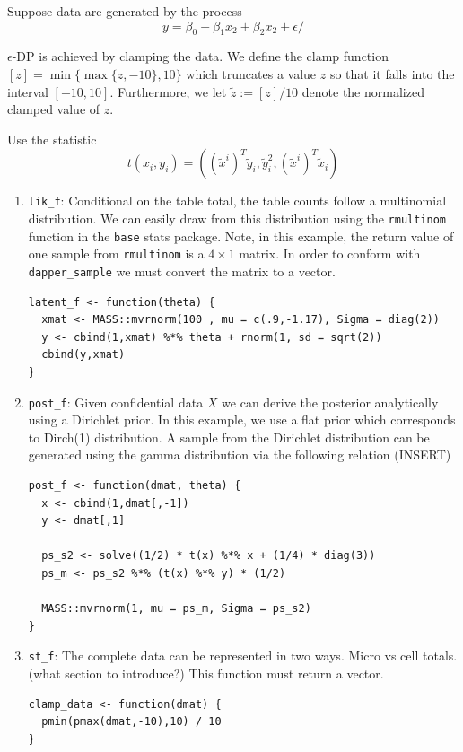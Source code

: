 Suppose data are generated by the process
\[
y = \beta_0 + \beta_1x_2 + \beta_2x_2 + \epsilon/
\]

\(\epsilon\)-DP is achieved by clamping the data. We define
the clamp function \([z] = \min\{\max\{z,-10\}, 10\}\) which truncates a value
\(z\) so that it falls into the interval \([-10,10]\). Furthermore, we let \(\tilde{z} := [z]/10\)
denote the normalized clamped value of \(z\).

Use the statistic
\[
t(x_i,y_i) = ((\tilde{x}^{i})^T \tilde{y}_i, \tilde{y}_i^2, (\tilde{x}^{i})^T \tilde{x}_i)
\]

\begin{enumerate}
\def\labelenumi{\arabic{enumi}.}
\item
  \texttt{lik\_f}: Conditional on the table total, the table counts follow a multinomial
  distribution. We can easily draw from this distribution using the
  \texttt{rmultinom} function in the \texttt{base} stats package. Note, in this example,
  the return value of one sample from \texttt{rmultinom} is a \(4 \times 1\) matrix. In order to
  conform with \texttt{dapper\_sample} we must convert the matrix to a vector.

\begin{verbatim}
latent_f <- function(theta) {
  xmat <- MASS::mvrnorm(100 , mu = c(.9,-1.17), Sigma = diag(2))
  y <- cbind(1,xmat) %*% theta + rnorm(1, sd = sqrt(2))
  cbind(y,xmat)
}
\end{verbatim}
\item
  \texttt{post\_f}: Given confidential data \(X\) we can derive the posterior analytically
  using a Dirichlet prior. In this example, we use a flat prior which
  corresponds to Dirch(1) distribution. A sample from the Dirichlet distribution
  can be generated using the gamma distribution via the following relation (INSERT)

\begin{verbatim}
post_f <- function(dmat, theta) {
  x <- cbind(1,dmat[,-1])
  y <- dmat[,1]

  ps_s2 <- solve((1/2) * t(x) %*% x + (1/4) * diag(3))
  ps_m <- ps_s2 %*% (t(x) %*% y) * (1/2)

  MASS::mvrnorm(1, mu = ps_m, Sigma = ps_s2)
}
\end{verbatim}
\item
  \texttt{st\_f}: The complete data can be represented in two ways. Micro vs cell totals.
  (what section to introduce?) This function must return a vector.

\begin{verbatim}
clamp_data <- function(dmat) {
  pmin(pmax(dmat,-10),10) / 10
}


\end{verbatim}
\end{enumerate}
